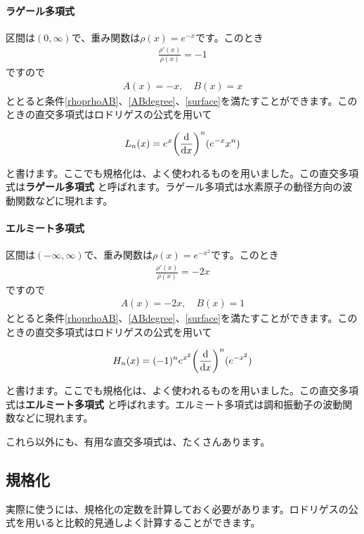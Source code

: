 \documentclass[report,paper=a4, fontsize=12pt, line_length=16cm, number_of_lines=33,dvipdfmx]{jlreq}
\newenvironment{important}{\begin{tcolorbox}[
  colback = white,
  colframe = red!35,
  boxrule = 2mm,
  fonttitle = \bfseries,
  after = \noindent] }{\end{tcolorbox}}
\numberwithin{equation}{section}
\newcommand{\strong}[1]{\textsf{\bfseries #1}}
\begin{document}
\paragraph{ラゲール多項式}
区間は$(0,\infty)$で、重み関数は$\rho(x)=e^{-x}$です。このとき
\begin{align}
  \frac{\rho'(x)}{\rho(x)}=-1
\end{align}
ですので
\begin{align}
  A(x)=-x,\quad B(x)=x
\end{align}
ととると条件\eqref{rhoprhoAB}、\eqref{ABdegree}、\eqref{surface}を満たすことができます。このときの直交多項式はロドリゲスの公式を用いて
\begin{important}
  \begin{align}
    L_{n}(x)=e^{x}\qty(\dv{x})^n(e^{-x}x^n)\label{Laguerre}
  \end{align}
\end{important}
と書けます。ここでも規格化は、よく使われるものを用いました。この直交多項式は\strong{ラゲール多項式}
と呼ばれます。ラゲール多項式は水素原子の動径方向の波動関数などに現れます。

\paragraph{エルミート多項式}
区間は$(-\infty,\infty)$で、重み関数は$\rho(x)=e^{-x^2}$です。このとき
\begin{align}
  \frac{\rho'(x)}{\rho(x)}=-2x
\end{align}
ですので
\begin{align}
  A(x)=-2x,\quad B(x)=1
\end{align}
ととると条件\eqref{rhoprhoAB}、\eqref{ABdegree}、\eqref{surface}を満たすことができます。このときの直交多項式はロドリゲスの公式を用いて
\begin{important}
  \begin{align}
    H_{n}(x)=(-1)^n e^{x^2}\qty(\dv{x})^n(e^{-x^2})\label{Hermite}
  \end{align}
\end{important}
と書けます。ここでも規格化は、よく使われるものを用いました。この直交多項式は\strong{エルミート多項式}
と呼ばれます。エルミート多項式は調和振動子の波動関数などに現れます。

これら以外にも、有用な直交多項式は、たくさんあります。

\subsection{規格化}
実際に使うには、規格化の定数を計算しておく必要があります。ロドリゲスの公式を用いると比較的見通しよく計算することができます。
\end{document}
